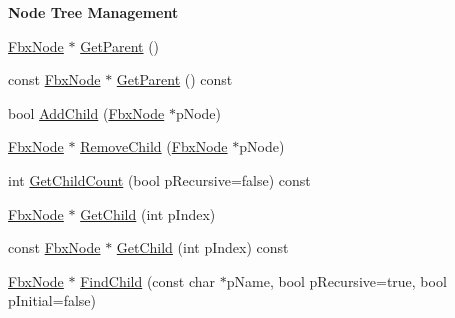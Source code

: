 \begin{Indent}\textbf{ Node Tree Management}\par
\begin{DoxyCompactItemize}
\item 
\hyperlink{class_fbx_node}{Fbx\+Node} $\ast$ \hyperlink{class_fbx_node_a452b51cc94cfd4751d08b8a1ce26f72c}{Get\+Parent} ()
\item 
const \hyperlink{class_fbx_node}{Fbx\+Node} $\ast$ \hyperlink{class_fbx_node_a2c54dfbb0a944b588ded5529dfcf720b}{Get\+Parent} () const
\item 
bool \hyperlink{class_fbx_node_af509126aa76e418e12af88a6d92e3475}{Add\+Child} (\hyperlink{class_fbx_node}{Fbx\+Node} $\ast$p\+Node)
\item 
\hyperlink{class_fbx_node}{Fbx\+Node} $\ast$ \hyperlink{class_fbx_node_ad2c979aa18554c574b147dffe72a0c98}{Remove\+Child} (\hyperlink{class_fbx_node}{Fbx\+Node} $\ast$p\+Node)
\item 
int \hyperlink{class_fbx_node_a25d388f54f8992b879c0f0c4320a9f71}{Get\+Child\+Count} (bool p\+Recursive=false) const
\item 
\hyperlink{class_fbx_node}{Fbx\+Node} $\ast$ \hyperlink{class_fbx_node_a1d5528c827ce76690350e60f5450dcfa}{Get\+Child} (int p\+Index)
\item 
const \hyperlink{class_fbx_node}{Fbx\+Node} $\ast$ \hyperlink{class_fbx_node_a951e6c8550271e24fcbb8d6c00b418c0}{Get\+Child} (int p\+Index) const
\item 
\hyperlink{class_fbx_node}{Fbx\+Node} $\ast$ \hyperlink{class_fbx_node_a1441f2388824df4fa975d287c03195a5}{Find\+Child} (const char $\ast$p\+Name, bool p\+Recursive=true, bool p\+Initial=false)
\end{DoxyCompactItemize}
\end{Indent}
